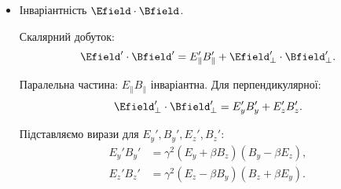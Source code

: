 \begin{problem}
\begin{itemize}
              Додаючи паралельну частину, отримуємо
              \begin{equation*}
                  \Efield'^2 - \Bfield'^2 = \Efield^2 - \Bfield^2.
              \end{equation*}

        \item Інваріантність $\Efield \cdot \Bfield$.

              Скалярний добуток:
              \begin{equation*}
                  \Efield' \cdot \Bfield' = E_\parallel' B_\parallel' + \Efield_\perp' \cdot \Bfield_\perp'.
              \end{equation*}

              Паралельна частина: \(E_\parallel B_\parallel\) інваріантна. Для перпендикулярної:
              \begin{equation*}
                  \Efield_\perp' \cdot \Bfield_\perp' = E_y' B_y' + E_z' B_z'.
              \end{equation*}

              Підставляємо вирази для \(E_y', B_y', E_z', B_z'\):
              \begin{equation*}
                  \begin{aligned}
                      E_y' B_y' & = \gamma^2 (E_y + \beta B_z)(B_y - \beta E_z), \\
                      E_z' B_z' & = \gamma^2 (E_z - \beta B_y)(B_z + \beta E_y).
                  \end{aligned}
              \end{equation*}


\end{itemize}
\end{problem}
